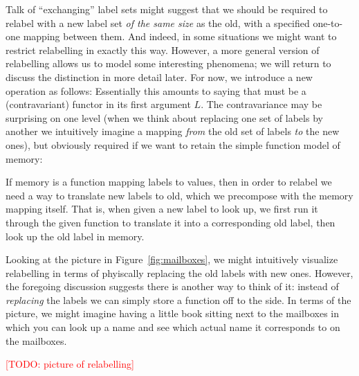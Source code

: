 \documentclass{jfp}
\newcommand{\todo}[1]{\textcolor{red}{[TODO: #1]}}
\newcommand{\todo}[1]{}
\begin{document}
Talk of ``exchanging'' label sets might suggest that we should be
required to relabel with a new label set \emph{of the same size} as
the old, with a specified one-to-one mapping between them.  And
indeed, in some situations we might want to restrict relabelling in
exactly this way.  However, a more general version of relabelling
allows us to model some interesting phenomena; we will return to
discuss the distinction in more detail later.  For now, we introduce a
new  operation as follows:
Essentially this amounts to saying that  must be a
(contravariant) functor in its first argument $L$.  The contravariance
may be surprising on one level (when we think about replacing one set
of labels by another we intuitively imagine a mapping \emph{from} the
old set of labels \emph{to} the new ones), but obviously required if
we want to retain the simple function model of memory:


If memory is a function mapping labels to values, then in order to
relabel we need a way to translate new labels to old, which we
precompose with the memory mapping itself.  That is, when given a new
label to look up, we first run it through the given function to
translate it into a corresponding old label, then look up the old
label in memory.

Looking at the picture in Figure~\ref{fig:mailboxes}, we might intuitively
visualize relabelling in terms of phyiscally replacing the old labels
with new ones. However, the foregoing discussion suggests there is
another way to think of it: instead of \emph{replacing} the labels we
can simply store a function off to the side.  In terms of the picture,
we might imagine having a little book sitting next to the mailboxes in
which you can look up a name and see which actual name it corresponds
to on the mailboxes.

\todo{picture of relabelling}
\end{document}
